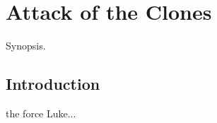 \chapter{Attack of the Clones}
	\label{chapter:attack-of-the-clones}%



\begin{synopsis}
	Synopsis.
\end{synopsis}


\section{Introduction}

 the force Luke...


